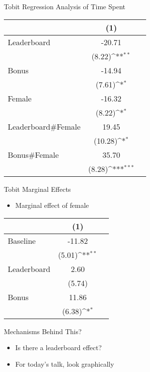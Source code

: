 \documentclass[14pt]{beamer}
\def\sym#1{\ifmmode^{#1}\else\(^{#1}\)\fi}
\begin{document}
\begin{frame}{Tobit Regression Analysis of Time Spent}
\begin{table}
\begin{tabular}{lcc}
\toprule
 & (1) \\
\midrule
Leaderboard	& -20.71 \\
	& (8.22)\sym{**} \\
Bonus & -14.94 \\
	& (7.61)\sym{*} \\
Female &	-16.32 \\
	& (8.22)\sym{*} \\
Leaderboard\#Female & 19.45  \\
	&(10.28)\sym{*} \\
Bonus\#Female & 35.70  \\
	& (8.28)\sym{***} \\
\bottomrule
\end{tabular}
\end{table}
\end{frame}

\begin{frame}{Tobit Marginal Effects}
\begin{itemize}
	\item Marginal effect of female
\end{itemize}
\begin{table}
\begin{tabular}{lcc}
\toprule
 & (1) \\
\midrule
Baseline & -11.82 \\
	& (5.01)\sym{**} \\
Leaderboard	& 2.60 \\
	& (5.74) \\
Bonus & 11.86 \\
	& (6.38)\sym{*} \\
\bottomrule
\end{tabular}
\end{table}
\end{frame}

\begin{frame}{Mechanisms Behind This?}
\begin{itemize}
	\item Is there a leaderboard effect?
	\item For today's talk, look graphically
\end{itemize}
\end{frame}

\begin{frame}{}
\end{frame}
\end{document}
